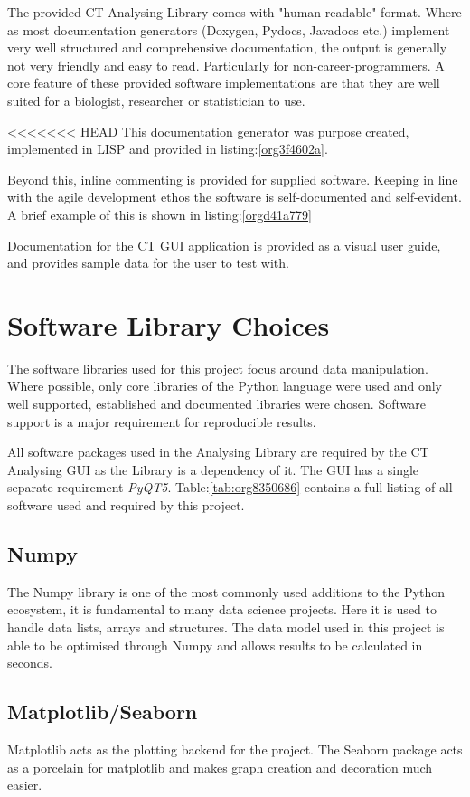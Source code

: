 \documentclass[11pt]{report}
\begin{document}
The provided CT Analysing Library comes with "human-readable" format. Where as most documentation generators (Doxygen, Pydocs, Javadocs etc.) implement very well structured and comprehensive documentation, the output is generally not very friendly and easy to read. Particularly for non-career-programmers. A core feature of these provided software implementations are that they are well suited for a biologist, researcher or statistician to use.

<<<<<<< HEAD
This documentation generator was purpose created, implemented in LISP and provided in listing:\ref{org3f4602a}.

Beyond this, inline commenting is provided for supplied software. Keeping in line with the agile development ethos the software is self-documented and self-evident. A brief example of this is shown in listing:\ref{orgd41a779}

Documentation for the CT GUI application is provided as a visual user guide, and provides sample data for the user to test with.
\section{Software Library Choices}
\label{sec:org3f08f22}
The software libraries used for this project focus around data manipulation. Where possible, only core libraries of the Python language were used and only well supported, established and documented libraries were chosen. Software support is a major requirement for reproducible results.

All software packages used in the Analysing Library are required by the CT Analysing GUI as the Library is a dependency of it. The GUI has a single separate requirement \emph{PyQT5}.
Table:\ref{tab:org8350686} contains a full listing of all software used and required by this project.
\subsection{Numpy}
\label{sec:org3439ead}
The Numpy library is one of the most commonly used additions to the Python ecosystem, it is fundamental to many data science projects. Here it is used to handle data lists, arrays and structures. The data model used in this project is able to be optimised through Numpy and allows results to be calculated in seconds.
\subsection{Matplotlib/Seaborn}
\label{sec:org5b07416}
Matplotlib acts as the plotting backend for the project. The Seaborn package acts as a porcelain for matplotlib and makes graph creation and decoration much easier.
\end{document}
